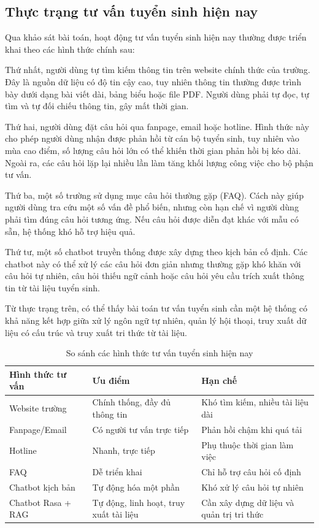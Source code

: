 \subsection{Thực trạng tư vấn tuyển sinh hiện nay}

Qua khảo sát bài toán, hoạt động tư vấn tuyển sinh hiện nay thường được triển khai theo các hình thức chính sau:

Thứ nhất, người dùng tự tìm kiếm thông tin trên website chính thức của trường. Đây là nguồn dữ liệu có độ tin cậy cao, tuy nhiên thông tin thường được trình bày dưới dạng bài viết dài, bảng biểu hoặc file PDF. Người dùng phải tự đọc, tự tìm và tự đối chiếu thông tin, gây mất thời gian.

Thứ hai, người dùng đặt câu hỏi qua fanpage, email hoặc hotline. Hình thức này cho phép người dùng nhận được phản hồi từ cán bộ tuyển sinh, tuy nhiên vào mùa cao điểm, số lượng câu hỏi lớn có thể khiến thời gian phản hồi bị kéo dài. Ngoài ra, các câu hỏi lặp lại nhiều lần làm tăng khối lượng công việc cho bộ phận tư vấn.

Thứ ba, một số trường sử dụng mục câu hỏi thường gặp (FAQ). Cách này giúp người dùng tra cứu một số vấn đề phổ biến, nhưng còn hạn chế vì người dùng phải tìm đúng câu hỏi tương ứng. Nếu câu hỏi được diễn đạt khác với mẫu có sẵn, hệ thống khó hỗ trợ hiệu quả.

Thứ tư, một số chatbot truyền thống được xây dựng theo kịch bản cố định. Các chatbot này có thể xử lý các câu hỏi đơn giản nhưng thường gặp khó khăn với câu hỏi tự nhiên, câu hỏi thiếu ngữ cảnh hoặc câu hỏi yêu cầu trích xuất thông tin từ tài liệu tuyển sinh.

Từ thực trạng trên, có thể thấy bài toán tư vấn tuyển sinh cần một hệ thống có khả năng kết hợp giữa xử lý ngôn ngữ tự nhiên, quản lý hội thoại, truy xuất dữ liệu có cấu trúc và truy xuất tri thức từ tài liệu.

\begin{table}[H]
    \centering
    \caption{So sánh các hình thức tư vấn tuyển sinh hiện nay}
    \label{tab:comparison_admission_consulting_methods}
    \begin{tabular}{|p{3.4cm}|p{5.2cm}|p{5.2cm}|}
        \hline
        \textbf{Hình thức tư vấn} & \textbf{Ưu điểm} & \textbf{Hạn chế} \\ \hline
        Website trường & Chính thống, đầy đủ thông tin & Khó tìm kiếm, nhiều tài liệu dài \\ \hline
        Fanpage/Email & Có người tư vấn trực tiếp & Phản hồi chậm khi quá tải \\ \hline
        Hotline & Nhanh, trực tiếp & Phụ thuộc thời gian làm việc \\ \hline
        FAQ & Dễ triển khai & Chỉ hỗ trợ câu hỏi cố định \\ \hline
        Chatbot kịch bản & Tự động hóa một phần & Khó xử lý câu hỏi tự nhiên \\ \hline
        Chatbot Rasa + RAG & Tự động, linh hoạt, truy xuất tài liệu & Cần xây dựng dữ liệu và quản trị tri thức \\ \hline
    \end{tabular}
\end{table}


